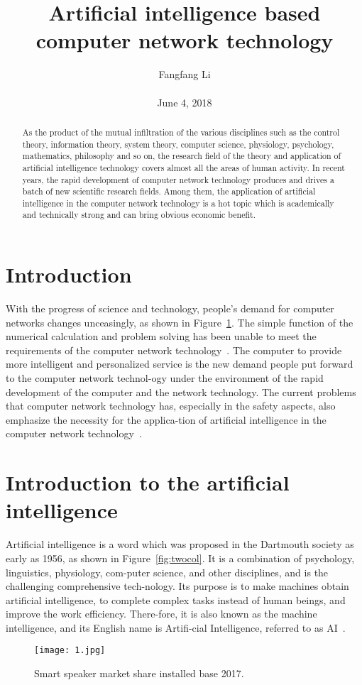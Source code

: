 \documentclass[10pt,twocolumn,letterpaper]{article}
\title{\textbf{Artificial intelligence based computer network technology}}
\author{Fangfang Li\\\\June 4, 2018}
\begin{document}
\maketitle

\begin{abstract}
  As the product of the mutual infiltration of the various disciplines such as the control theory, information theory, system theory, computer science, physiology, psychology, mathematics, philosophy and so on, the research field of the theory and application of artificial intelligence technology covers almost all the areas of human activity. In recent years, the rapid development of computer network technology produces and drives a batch of new scientific research fields. Among them, the application of artificial intelligence in the computer network technology is a hot topic which is academically and technically strong and can bring obvious economic benefit.
\end{abstract}

\section{Introduction}
With the progress of science and technology, people’s demand for computer networks changes unceasingly, as shown in Figure~\ref{fig:onecol}. The simple function of the numerical calculation and problem solving has been unable to meet the requirements of the computer network technology~\cite{horn1981determining}. The computer to provide more intelligent and personalized service is the new demand people put forward to the computer network technol-ogy under the environment of the rapid development of the computer and the network technology. The current problems that computer network technology has, especially in the safety aspects, also emphasize the necessity for the applica-tion of artificial intelligence in the computer network technology~\cite{fikes1971strips}.


\section{Introduction to the artificial intelligence}
Artificial intelligence is a word which was proposed in the Dartmouth society as early as 1956, as shown in Figure~\ref{fig:twocol}. It is a combination of psychology, linguistics, physiology, com-puter science, and other disciplines, and is the challenging comprehensive tech-nology. Its purpose is to make machines obtain artificial intelligence, to complete complex tasks instead of human beings, and improve the work efficiency. There-fore, it is also known as the machine intelligence, and its English name is Artifi-cial Intelligence, referred to as AI~\cite{Kong_2016_CVPR_Workshops}.
\begin{figure}[!htb]
\begin{center}
   \texttt{[image: 1.jpg]}
\end{center}
   \caption{Smart speaker market share installed base 2017.}
\label{fig:onecol}
\end{figure}
\end{document}

